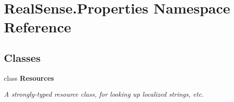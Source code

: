 \hypertarget{namespace_real_sense_1_1_properties}{}\section{Real\+Sense.\+Properties Namespace Reference}
\label{namespace_real_sense_1_1_properties}
\subsection*{Classes}
\begin{DoxyCompactItemize}
\item 
class {\bfseries Resources}
\begin{DoxyCompactList}\small\item\em A strongly-\/typed resource class, for looking up localized strings, etc. \end{DoxyCompactList}\end{DoxyCompactItemize}
